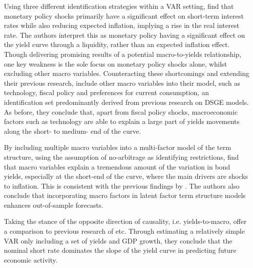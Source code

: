 Using three different identification strategies within a VAR setting, \citet{evans1998monetary} find that monetary policy shocks primarily  have a significant effect on short-term interest rates while also reducing expected inflation, implying a rise in the real interest rate. 
The authors interpret this as monetary policy having a significant effect on the yield curve through a liquidity, rather than an expected inflation effect. 
Though delivering promising results of a potential macro-to-yields relationship, one key weakness is the sole focus on monetary policy shocks alone, whilst excluding other macro variables. 
Counteracting these shortcomings and extending their previous research, \citet{evans2007economic} include other macro variables into their model, such as technology, fiscal policy and preferences for current consumption, an identification set predominantly derived from previous research on DSGE models. As before, they conclude that, apart from fiscal policy shocks, macroeconomic factors such as technology are able to explain a large part of yields movements along the short- to medium- end of the curve. 


By including multiple macro variables into a multi-factor model of the term structure, using the assumption of no-arbitrage as identifying restrictions, \citet{ang2003no} find that macro variables explain a tremendous amount of the variation in bond yields, especially at the short-end of the curve, where the main drivers are shocks to inflation. This is consistent with the previous findings by \citet{evans1998monetary}. 
The authors also conclude that incorporating macro factors in latent factor term structure models enhances out-of-sample forecasts. 

Taking the stance of the opposite direction of causality, i.e. yields-to-macro, \citet{ang2006does} offer a comparison to previous research of \citet{estrella1991term} etc. 
Through estimating a relatively simple VAR only including a set of yields and GDP growth, they conclude that the nominal short rate dominates the slope of the yield curve in predicting future economic activity. 

